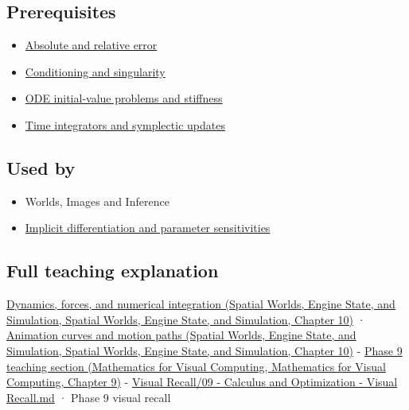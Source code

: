 \subsection{Prerequisites}\label{appendix-18eacf61a04b-prerequisites}

\begin{itemize}
\tightlist
\item
  \hyperref[appendix-3ae74e89b4e6]{Absolute and relative error}
\item
  \hyperref[appendix-8f6a01f284a7]{Conditioning and singularity}
\item
  \hyperref[appendix-e8ab9836882e]{ODE initial-value problems and stiffness}
\item
  \hyperref[appendix-8f96f9c4d5bc]{Time integrators and symplectic updates}
\end{itemize}

\subsection{Used by}\label{appendix-18eacf61a04b-used-by}

\begin{itemize}
\tightlist
\item
  {Worlds, Images and Inference}
\item
  \hyperref[appendix-8836553d56fc]{Implicit differentiation and parameter sensitivities}
\end{itemize}

\subsection{Full teaching explanation}\label{appendix-18eacf61a04b-full-teaching-explanation}

\href{../05-Spatial-Worlds-Engine-State-and-Simulation/main.pdf\#nameddest=04-visual-computing-ii-ch029-dynamics-forces-and-numerical-integration}{Dynamics, forces, and numerical integration (Spatial Worlds, Engine State, and Simulation, Spatial Worlds, Engine State, and Simulation, Chapter 10)} · \href{../05-Spatial-Worlds-Engine-State-and-Simulation/main.pdf\#nameddest=04-visual-computing-ii-ch029-animation-curves-and-motion-paths}{Animation curves and motion paths (Spatial Worlds, Engine State, and Simulation, Spatial Worlds, Engine State, and Simulation, Chapter 10)} - \href{../02-Mathematics-for-Visual-Computing/main.pdf\#nameddest=02-foundations-ii-ch025-odes-and-numerical-simulation}{Phase 9 teaching section (Mathematics for Visual Computing, Mathematics for Visual Computing, Chapter 9)} - \hyperref[appendix-adf48f5dc5c1]{Visual Recall/09 - Calculus and Optimization - Visual Recall.md} · Phase 9 visual recall

